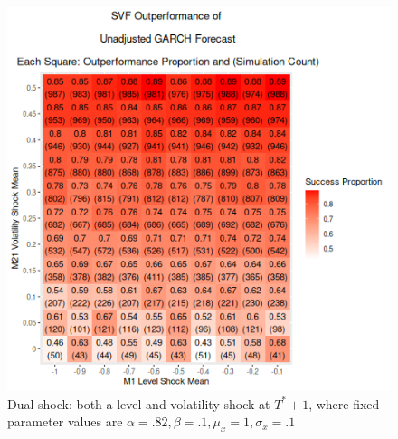 \documentclass[11pt]{article}
\theoremstyle{definition}
\begin{document}
\begin{figure}[h]
  \begin{center}
    \includegraphics[scale=.5]{simulation_plots/dual_level_vol_shock_FriFeb0911:27:59PM2024.png}
    \caption{Dual shock: both a level and volatility shock at $T^{*}+1$, where fixed parameter values are $\alpha = .82, \beta = .1, \mu_{x} = 1, \sigma_{x} = .1$}
    \label{fig:dual_shock_strong_alpha}
    \end{center}
  \end{figure}
\end{document}
